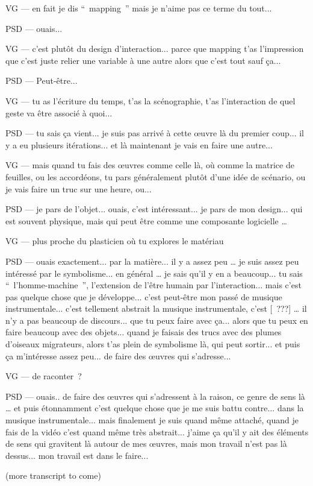 VG — en fait je dis “ mapping ” mais je n'aime pas ce terme du tout... 

PSD — ouais...  

VG — c'est plutôt du design d'interaction... parce que mapping t'as l'impression que c'est juste relier une variable à une autre alors que c'est tout sauf ça... 

PSD — Peut-être... 

VG — tu as l'écriture du temps, t'as la scénographie, t'as l'interaction de quel geste va être associé à quoi... 

PSD — tu sais ça vient... je suis pas arrivé à cette œuvre là du premier coup... il y a eu plusieurs itérations... et là maintenant je vais en faire une autre... 

VG — mais quand tu fais des œuvres comme celle là, où comme la matrice de feuilles, ou les accordéons, tu pars généralement plutôt d'une idée de scénario, ou je vais faire un truc sur une heure, ou... 

PSD — je pars de l'objet... ouais, c'est intéressant... je pars de mon design... qui est souvent physique, mais qui peut être comme une composante logicielle … 

VG — plus proche du plasticien où tu explores le matériau 

PSD — ouais exactement... par la matière... il y a assez peu … je suis assez peu intéressé par le symbolisme... en général … je sais qu'il y en a beaucoup... tu sais “ l'homme-machine ”,  l'extension de l'être humain par l'interaction... mais c'est pas quelque chose que je développe... c'est peut-être mon passé de musique instrumentale... c'est tellement abstrait la musique instrumentale, c'est [ ???] … il n'y a pas beaucoup de discours... que tu peux faire avec ça... alors que tu peux en faire beaucoup avec des objets... quand je faisais des trucs avec des plumes d'oiseaux migrateurs, alors t'as plein de symbolisme là, qui peut sortir... et puis ça m'intéresse assez peu... de faire des œuvres qui s'adresse... 

VG — de raconter ? 

PSD — ouais.. de faire des œuvres qui s'adressent à la raison, ce genre de sens là … et puis étonnamment c'est quelque chose que je me suis battu contre... dans la musique instrumentale... mais finalement je suis quand même attaché, quand je fais de la vidéo c'est quand même très abstrait... j'aime ça qu'il y ait des éléments de sens qui gravitent là autour de mes œuvres, mais mon travail n'est pas là dessus... mon travail est dans le faire... 

(more transcript to come)